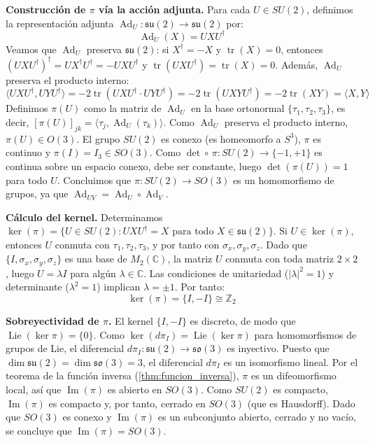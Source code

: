 \begin{example}
\textbf{Construcción de $\pi$ vía la acción adjunta.}
Para cada $U \in SU(2)$, definimos la representación adjunta $\operatorname{Ad}_U: \mathfrak{su}(2) \to \mathfrak{su}(2)$ por:
\begin{equation}\label{eq:adjoint_su2}
	\operatorname{Ad}_U(X) = UXU^\dagger
\end{equation}
Veamos que $\operatorname{Ad}_U$ preserva $\mathfrak{su}(2)$: si $X^\dagger = -X$ y $\operatorname{tr}(X) = 0$, entonces $(UXU^\dagger)^\dagger = UX^\dagger U^\dagger = -UXU^\dagger$ y $\operatorname{tr}(UXU^\dagger) = \operatorname{tr}(X) = 0$. Además, $\operatorname{Ad}_U$ preserva el producto interno:
\[
	\langle UXU^\dagger, UYU^\dagger \rangle = -2\operatorname{tr}(UXU^\dagger \cdot UYU^\dagger) = -2\operatorname{tr}(UXYU^\dagger) = -2\operatorname{tr}(XY) = \langle X, Y \rangle
\]
Definimos $\pi(U)$ como la matriz de $\operatorname{Ad}_U$ en la base ortonormal $\{\tau_1, \tau_2, \tau_3\}$, es decir, $[\pi(U)]_{jk} = \langle \tau_j, \operatorname{Ad}_U(\tau_k) \rangle$. Como $\operatorname{Ad}_U$ preserva el producto interno, $\pi(U) \in O(3)$. El grupo $SU(2)$ es conexo (es homeomorfo a $S^3$), $\pi$ es continuo y $\pi(I) = I_3 \in SO(3)$. Como $\det \circ\, \pi: SU(2) \to \{-1, +1\}$ es continua sobre un espacio conexo, debe ser constante, luego $\det(\pi(U)) = 1$ para todo $U$. Concluimos que $\pi: SU(2) \to SO(3)$ es un homomorfismo de grupos, ya que $\operatorname{Ad}_{UV} = \operatorname{Ad}_U \circ \operatorname{Ad}_V$.

\textbf{Cálculo del kernel.}
Determinamos $\ker(\pi) = \{U \in SU(2) : UXU^\dagger = X \text{ para todo } X \in \mathfrak{su}(2)\}$. Si $U \in \ker(\pi)$, entonces $U$ conmuta con $\tau_1, \tau_2, \tau_3$, y por tanto con $\sigma_x, \sigma_y, \sigma_z$. Dado que $\{I, \sigma_x, \sigma_y, \sigma_z\}$ es una base de $M_2(\mathbb{C})$, la matriz $U$ conmuta con toda matriz $2 \times 2$, luego $U = \lambda I$ para algún $\lambda \in \mathbb{C}$. Las condiciones de unitariedad ($|\lambda|^2 = 1$) y determinante ($\lambda^2 = 1$) implican $\lambda = \pm 1$. Por tanto:
\begin{equation}\label{eq:kernel_pi}
	\ker(\pi) = \{I, -I\} \cong \mathbb{Z}_2
\end{equation}

\textbf{Sobreyectividad de $\pi$.}
El kernel $\{I, -I\}$ es discreto, de modo que $\operatorname{Lie}(\ker \pi) = \{0\}$. Como $\ker(d\pi_I) = \operatorname{Lie}(\ker \pi)$ para homomorfismos de grupos de Lie, el diferencial $d\pi_I: \mathfrak{su}(2) \to \mathfrak{so}(3)$ es inyectivo. Puesto que $\dim \mathfrak{su}(2) = \dim \mathfrak{so}(3) = 3$, el diferencial $d\pi_I$ es un isomorfismo lineal. Por el teorema de la función inversa (\autoref{thm:funcion_inversa}), $\pi$ es un difeomorfismo local, así que $\operatorname{Im}(\pi)$ es abierto en $SO(3)$. Como $SU(2)$ es compacto, $\operatorname{Im}(\pi)$ es compacto y, por tanto, cerrado en $SO(3)$ (que es Hausdorff). Dado que $SO(3)$ es conexo y $\operatorname{Im}(\pi)$ es un subconjunto abierto, cerrado y no vacío, se concluye que $\operatorname{Im}(\pi) = SO(3)$.


\end{example}
